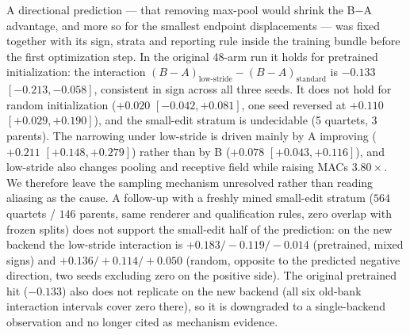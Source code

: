 A directional prediction --- that removing max-pool would shrink the B$-$A advantage, and more so for the smallest endpoint displacements --- was fixed together with its sign, strata and reporting rule inside the training bundle before the first optimization step. In the original 48-arm run it holds for pretrained initialization: the interaction $(B-A)_{\text{low-stride}}-(B-A)_{\text{standard}}$ is $-0.133$ $[-0.213,-0.058]$, consistent in sign across all three seeds. It does not hold for random initialization ($+0.020$ $[-0.042,+0.081]$, one seed reversed at $+0.110$ $[+0.029,+0.190]$), and the small-edit stratum is undecidable (5 quartets, 3 parents). The narrowing under low-stride is driven mainly by A improving ($+0.211$ $[+0.148,+0.279]$) rather than by B ($+0.078$ $[+0.043,+0.116]$), and low-stride also changes pooling and receptive field while raising MACs $3.80\times$. We therefore leave the sampling mechanism unresolved rather than reading aliasing as the cause. A follow-up with a freshly mined small-edit stratum ($564$ quartets / $146$ parents, same renderer and qualification rules, zero overlap with frozen splits) does not support the small-edit half of the prediction: on the new backend the low-stride interaction is $+0.183/-0.119/-0.014$ (pretrained, mixed signs) and $+0.136/+0.114/+0.050$ (random, opposite to the predicted negative direction, two seeds excluding zero on the positive side). The original pretrained hit ($-0.133$) also does not replicate on the new backend (all six old-bank interaction intervals cover zero there), so it is downgraded to a single-backend observation and no longer cited as mechanism evidence.

